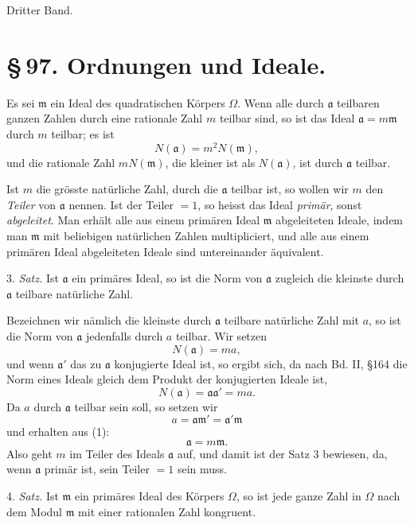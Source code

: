 \documentclass[11pt]{article}
\begin{document}
\begin{center}{\large Dritter Band.}\end{center}


\section*{\S\,97. Ordnungen und Ideale.}

Es sei $\mathfrak m$ ein Ideal des quadratischen Körpers $\Omega$. Wenn alle durch $\mathfrak a$ teilbaren ganzen Zahlen durch eine rationale Zahl $m$ teilbar sind, so ist das Ideal $\mathfrak a=m\mathfrak m$ durch $m$ teilbar; es ist
\[
 N(\mathfrak a)=m^2N(\mathfrak m),
\]
und die rationale Zahl $mN(\mathfrak m)$, die kleiner ist als $N(\mathfrak a)$, ist durch $\mathfrak a$ teilbar.

Ist $m$ die grösste natürliche Zahl, durch die $\mathfrak a$ teilbar ist, so wollen wir $m$ den \emph{Teiler} von $\mathfrak a$ nennen. Ist der Teiler $=1$, so heisst das Ideal \emph{primär}, sonst \emph{abgeleitet}. Man erhält alle aus einem primären Ideal $\mathfrak m$ abgeleiteten Ideale, indem man $\mathfrak m$ mit beliebigen natürlichen Zahlen multipliciert, und alle aus einem primären Ideal abgeleiteten Ideale sind untereinander äquivalent.

3. \emph{Satz.} Ist $\mathfrak a$ ein primäres Ideal, so ist die Norm von $\mathfrak a$ zugleich die kleinste durch $\mathfrak a$ teilbare natürliche Zahl.

Bezeichnen wir nämlich die kleinste durch $\mathfrak a$ teilbare natürliche Zahl mit $a$, so ist die Norm von $\mathfrak a$ jedenfalls durch $a$ teilbar. Wir setzen
\[
 N(\mathfrak a)=ma,
\]
und wenn $\mathfrak a'$ das zu $\mathfrak a$ konjugierte Ideal ist, so ergibt sich, da nach Bd. II, \S 164 die Norm eines Ideals gleich dem Produkt der konjugierten Ideale ist,
\begin{equation}
 N(\mathfrak a)=\mathfrak a\mathfrak a'=ma.
\tag{1}
\end{equation}
Da $a$ durch $\mathfrak a$ teilbar sein soll, so setzen wir
\[
 a=\mathfrak a\mathfrak m'=\mathfrak a'\mathfrak m
\]
und erhalten aus (1):
\begin{equation}
 \mathfrak a=m\mathfrak m.
\tag{2}
\end{equation}
Also geht $m$ im Teiler des Ideals $\mathfrak a$ auf, und damit ist der Satz 3 bewiesen, da, wenn $\mathfrak a$ primär ist, sein Teiler $=1$ sein muss.

4. \emph{Satz.} Ist $\mathfrak m$ ein primäres Ideal des Körpers $\Omega$, so ist jede ganze Zahl in $\Omega$ nach dem Modul $\mathfrak m$ mit einer rationalen Zahl kongruent.
\end{document}
